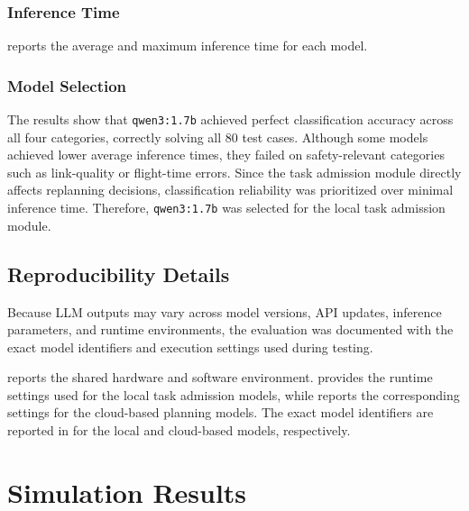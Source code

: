\subsubsection{Inference Time}
 reports the average and maximum inference time for each model.



\subsubsection{Model Selection}
The results show that \texttt{qwen3:1.7b} achieved perfect classification accuracy across all four categories,
correctly solving all 80 test cases. Although some models achieved lower average inference times, they
failed on safety-relevant categories such as link-quality or flight-time errors. Since the task
admission module directly affects replanning decisions, classification reliability was prioritized over
minimal inference time. Therefore, \texttt{qwen3:1.7b} was selected for the local task admission module.

\subsection{Reproducibility Details}

Because LLM outputs may vary across model versions, API updates, inference parameters, and
runtime environments, the evaluation was documented with the exact model identifiers and
execution settings used during testing.

 reports the shared hardware and software environment.
 provides the runtime settings used for the local task
admission models, while  reports the corresponding
settings for the cloud-based planning models. The exact model identifiers are reported in
 for the local and cloud-based models,
respectively.







\section{Simulation Results}

